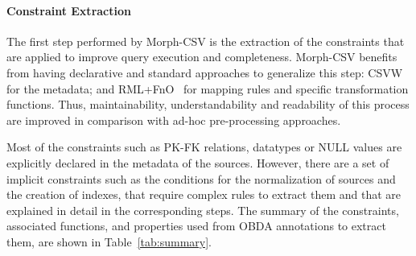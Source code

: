 \paragraph{Constraint Extraction}
The first step performed by Morph-CSV is the extraction of the constraints that are applied to improve query execution and completeness. Morph-CSV benefits from having declarative and standard approaches to generalize this step: CSVW~\citep{tennison2015model} for the metadata; and RML+FnO~\citep{de2017declarative} for mapping rules and specific transformation functions. Thus, maintainability, understandability and readability of this process are improved in comparison with ad-hoc pre-processing approaches. 

Most of the constraints such as PK-FK relations, datatypes or NULL values are explicitly declared in the metadata of the sources. However, there are a set of implicit constraints such as the conditions for the normalization of sources and the creation of indexes, that require complex rules to extract them and that are explained in detail in the corresponding steps. The summary of the constraints, associated functions, and properties used from OBDA annotations to extract them, are shown in Table~\ref{tab:summary}.


